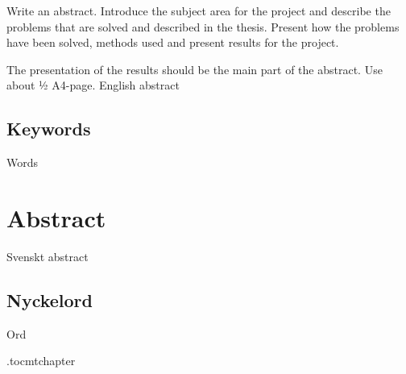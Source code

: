 \vspace{2cm}
Write an abstract. Introduce the subject area for the project and describe the problems that are solved and described in the thesis. Present how the problems have been solved, methods used and present results for the project. 

The presentation of the results should be the main part of the abstract. Use about ½ A4-page.
English abstract

\subsection*{Keywords}
Words

\newpage
\section*{Abstract}
Svenskt abstract

\subsection*{Nyckelord}
Ord


\etocdepthtag.toc{mtchapter}
\newpage
\thispagestyle{fancy}
\tableofcontents
\thispagestyle{fancy} %
